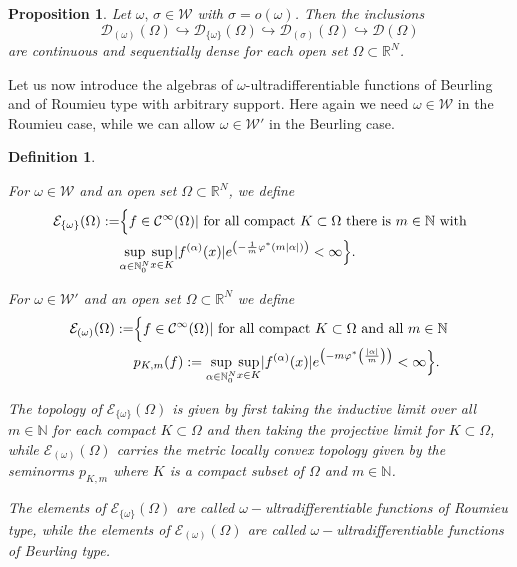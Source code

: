 \documentclass[twoside]{amsart}
\newtheorem{Def}[Th]{Definition}
\newtheorem{Prop}[Th]{Proposition}
\begin{document}
\begin{Prop}
\label{prop:3.9}
Let $\omega,\,\sigma\in{\mathcal{W}}$ with $\sigma=o(\omega)$.
Then the inclusions 
\[
{\mathcal{D}}_{(\omega)}(\Omega)\hookrightarrow{\mathcal{D}}_{\{\omega\}}(\Omega)
\hookrightarrow{\mathcal{D}}_{(\sigma)}(\Omega)\hookrightarrow{\mathcal{D}}(\Omega)
\]
are continuous and sequentially dense for each open set $\Omega\subset{\mathbb R}^N$.
\end{Prop}

Let us now introduce the algebras of $\omega$-ultradifferentiable
functions of Beurling and of Roumieu type with arbitrary support.
Here again we need $\omega\in{\mathcal{W}}$ in the Roumieu case, while we can allow
$\omega\in{\mathcal{W}}'$ in the Beurling case.

\begin{Def}
  \label{def227}
\begin{em}
For
$\omega\in{\mathcal{W}}$ and an open set $\Omega\subset{\mathbb R}^N$, we define
\begin{align*}
  {\mathcal{E}}_{\{\omega\}}(\Omega):= & \Big\{f\in{\mathcal C}^\infty(\Omega)|
  \mbox{\,\,for all compact}\,\,
K\subset\Omega\,\mbox{\,there is }m\in\mathbb{N}\,\mbox{\,with}\\
 & \underset{\alpha\in\mathbb{N}_{0}^{N}}{\sup}\underset{x\in K}{\sup}
|f^{(\alpha)}(x)|e^{\left(-\frac{1}{m}\varphi^{*}(m|\alpha|)\right)}<\infty\Big\}.
\end{align*}

For $\omega\in{\mathcal{W}}'$ and an open set $\Omega\subset{\mathbb R}^N$ we define
\begin{align*}
  {\mathcal{E}}_{(\omega)}(\Omega):= & \Big\{f\in{\mathcal C}^\infty(\Omega)|
  \mbox{\,\,for all compact}\,\,
K\subset\Omega\,\,\mbox{and all}\,\,m\in\mathbb{N}\,\\
 & p_{K,m}(f):=\underset{\alpha\in\mathbb{N}_{0}^{N}}{\sup}
\underset{x\in K}{\sup}|f^{(\alpha)}(x)|
e^{\left(-m\varphi^{*}\left(\frac{|\alpha|}{m}\right)\right)}<\infty\Big\}.
\end{align*}

The topology of ${\mathcal{E}}_{\{\omega\}}(\Omega)$ is given by first taking the inductive
limit over all $m\in\mathbb{N}$ for each compact $K\subset\Omega$
and then taking the projective limit for $K\subset\Omega$, while
${\mathcal{E}}_{(\omega)}(\Omega)$ carries the metric locally convex topology given by the
seminorms $p_{K,m}$ where $K$ is a compact subset of $\Omega$ and
$m\in\mathbb{N}$.

The elements of ${\mathcal{E}}_{\{\omega\}}(\Omega)$ are called 
\emph{$\omega-$ultradifferentiable
  functions of Roumieu type}, while the elements of ${\mathcal{E}}_{(\omega)}(\Omega)$
are called
\emph{$\omega-$ultradifferentiable functions of Beurling type}.
\end{em}
\end{Def}
\end{document}
